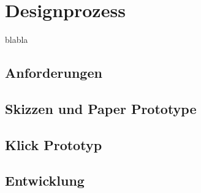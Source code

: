 \section{Designprozess}
blabla
\subsection{Anforderungen}
\subsection{Skizzen und Paper Prototype}
\subsection{Klick Prototyp}
\subsection{Entwicklung}